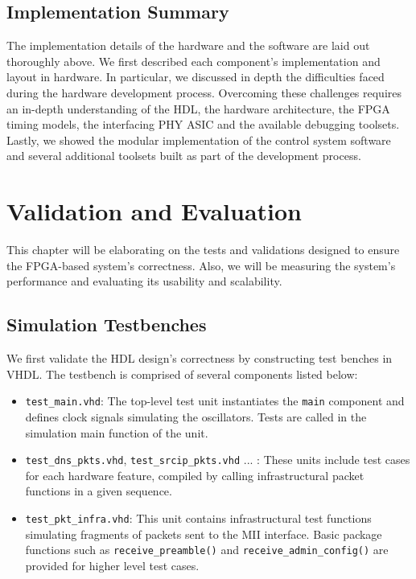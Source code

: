 \documentclass[a4paper]{report}
\newcommand{\proglang}{\textsf}
\newcommand{\code}{\texttt}
\begin{document}
\section{Implementation Summary}

The implementation details of the hardware and the software are laid out thoroughly above. We first described each component's implementation and layout in hardware. In particular, we discussed in depth the difficulties faced during the hardware development process. Overcoming these challenges requires an in-depth understanding of the HDL, the hardware architecture, the FPGA timing models, the interfacing PHY ASIC and the available debugging toolsets. Lastly, we showed the modular implementation of the control system software and several additional toolsets built as part of the development process.

\chapter{Validation and Evaluation}

This chapter will be elaborating on the tests and validations designed to ensure the FPGA-based system's correctness. Also, we will be measuring the system's performance and evaluating its usability and scalability. 

\section{Simulation Testbenches}
\label{section:validation-simulation}

We first validate the HDL design's correctness by constructing test benches in \proglang{VHDL}. The testbench is comprised of several components listed below:

\begin{itemize}
    \item \code{test\_main.vhd}: The top-level test unit instantiates the \code{main} component and defines clock signals simulating the oscillators. Tests are called in the simulation main function of the unit.
    \item \code{test\_dns\_pkts.vhd}, \code{test\_srcip\_pkts.vhd} ... : These units include test cases for each hardware feature, compiled by calling infrastructural packet functions in a given sequence. 
    \item \code{test\_pkt\_infra.vhd}: This unit contains infrastructural test functions simulating fragments of packets sent to the MII interface. Basic package functions such as \code{receive\_preamble()} and \code{receive\_admin\_config()} are provided for higher level test cases.
\end{itemize}
\end{document}
